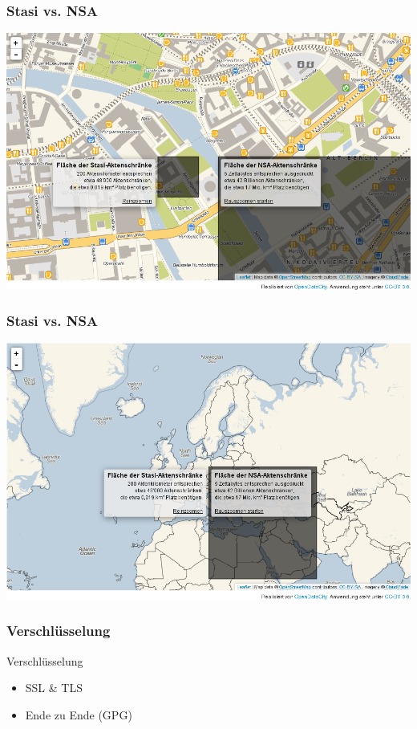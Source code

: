 \documentclass[12pt]{beamer}
\begin{document}
\begin{frame}
\begin{frame}
    \frametitle{Stasi vs. NSA}
    \includegraphics[height=0.7\textheight]{img/akten1.png}
\end{frame}

\begin{frame}
    \frametitle{Stasi vs. NSA}
    \includegraphics[height=0.7\textheight]{img/akten2.png}
\end{frame}

\begin{frame}
  \frametitle{Verschlüsselung}
  \begin{center} \Large
  Verschlüsselung\\
  \begin{itemize}
  	\item <3-> SSL \& TLS
	\item <3-> Ende zu Ende (GPG)
  \end{itemize}
  \end{center}
\end{frame}


\end{frame}
\end{document}
